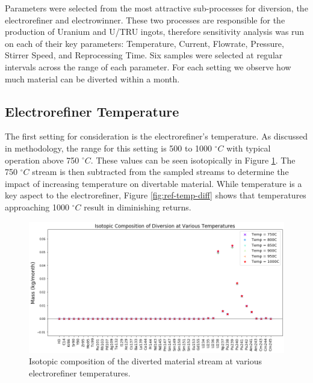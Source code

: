 Parameters were selected from the most attractive
sub-processes for diversion, the electrorefiner and electrowinner. These two processes are responsible for the production of Uranium and U/TRU ingots, therefore sensitivity analysis was run
on each of their key parameters: Temperature, Current, Flowrate, Pressure, Stirrer Speed, and Reprocessing Time. Six samples were selected at regular intervals across the range of each parameter. For each setting we observe how much material can be diverted within a month.

\subsection{Electrorefiner Temperature}

The first setting for consideration is the electrorefiner's temperature. As discussed in methodology, the range for this setting is 500 to 1000 $^\circ C$ with typical operation above 750 $^\circ C$. These values can be seen isotopically in Figure \ref{fig:ref-temp-sa}.
The 750 $^\circ C$ stream is then subtracted from the sampled streams to determine the impact of increasing temperature on divertable material.
While temperature is a key aspect to the electrorefiner, Figure \ref{fig:ref-temp-diff} shows that temperatures approaching 1000 $^\circ C$ result in diminishing returns.

\begin{figure}
	\includegraphics[width=\linewidth]{images/temperature-sa-comp}
	\caption{Isotopic composition of the diverted material stream at various electrorefiner temperatures.}
	\label{fig:ref-temp-sa}
\end{figure}

